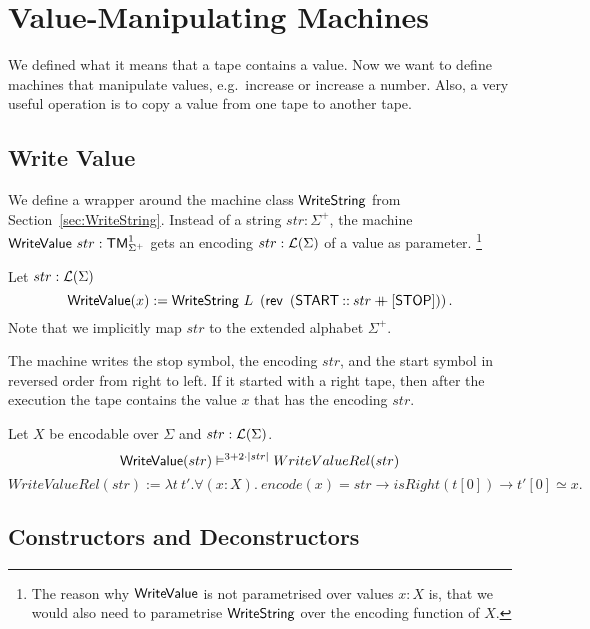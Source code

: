 \section{Value-Manipulating Machines}
\label{sec:value-manipulate}

We defined what it means that a tape contains a value.  Now we want to define machines that manipulate values, e.g.\ increase or increase a number.
Also, a very useful operation is to copy a value from one tape to another tape.

\subsection{Write Value}
\label{sec:WriteValue}

We define a wrapper around the machine class $\mathsf{WriteString}$ from Section~\ref{sec:WriteString}.  Instead of a string $str : \Sigma^+$, the machine
$\mathsf{WriteValue}~str : \mathsf{TM}_{\Sigma^+}^1$ gets an encoding $str:\mathcal{L}(\Sigma)$ of a value as parameter.%
\footnote{The reason why $\MS{WriteValue}$ is not parametrised over values $x:X$ is, that we would also need to parametrise $\mathsf{WriteString}$ over
  the encoding function of $X$.}%
\begin{definition}[$\MS{WriteValue}$]
  \label{def:WriteValue}
  Let $str:\mathcal{L}(\Sigma)$
  \[
    \mathsf{WriteValue}(x) := \mathsf{WriteString}~L~\left(\mathsf{rev}~\left(\mathsf{START} \mathbin{::} str \mathbin{+\mkern-10mu+} [\mathsf{STOP}]\right)\right).
  \]
  Note that we implicitly map $str$ to the extended alphabet $\Sigma^+$.
\end{definition}
The machine writes the stop symbol, the encoding $str$, and the start symbol in reversed order from right to left.  If it started with a right tape,
then after the execution the tape contains the value $x$ that has the encoding $str$.
\begin{lemma}
  \label{lem:WriteValue_Sem}
  Let $X$ be encodable over $\Sigma$ and $str : \mathcal{L}(\Sigma)$.
  \[
    \mathsf{WriteValue}(str) \mathrel{\vDash^{3 + 2 \cdot \left| str \right|}} WriteValueRel(str)
  \]
  \[
    WriteValueRel(str) := \lambda t~t'. \forall (x:X).~encode(x) = str \rightarrow isRight(t[0]) \rightarrow t'[0] \simeq x.
  \]
\end{lemma}


\subsection{Constructors and Deconstructors}
\label{sec:constructors-deconstructors}


